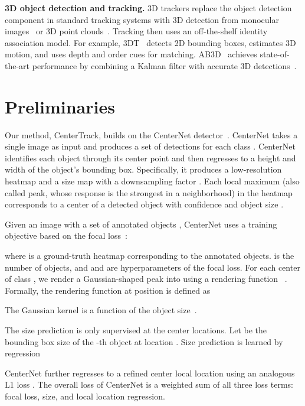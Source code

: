 \documentclass[runningheads]{llncs}
\renewcommand{\paragraph}[1]{\noindent\textbf{#1}}
\begin{document}
\paragraph{3D object detection and tracking.}
3D trackers replace the object detection component in standard tracking systems with 3D detection from monocular images~\cite{ren2017accurate} or 3D point clouds~\cite{zhu2019class,shi2019pointrcnn}.
Tracking then uses an off-the-shelf identity association model.
For example, 3DT~\cite{Hu3DT19} detects 2D bounding boxes, estimates 3D motion, and uses depth and order cues for matching.
AB3D~\cite{Weng2019_3dmot} achieves state-of-the-art performance by combining a Kalman filter with accurate 3D detections~\cite{shi2019pointrcnn}.

\section{Preliminaries}

Our method, CenterTrack, builds on the CenterNet detector~\cite{zhou2019objects}.
CenterNet takes a single image  as input and produces a set of detections  for each class .
CenterNet identifies each object through its center point  and then regresses to a height and width  of the object's bounding box.
Specifically, it produces a low-resolution heatmap  and a size map  with a downsampling factor . 
Each local maximum  (also called peak, whose response is the strongest in a  neighborhood) in the heatmap  corresponds to a center of a detected object with confidence  and object size .

Given an image with a set of annotated objects , CenterNet uses a training objective based on the focal loss~\cite{law2018cornernet,lin2017focal}:

where  is a ground-truth heatmap corresponding to the annotated objects.
 is the number of objects, and  and  are hyperparameters of the focal loss. 
For each center  of class , we render a Gaussian-shaped peak into  using a rendering function ~\cite{law2018cornernet}.
Formally, the rendering function at position  is defined as

The Gaussian kernel  is a function of the object size~\cite{law2018cornernet}.

The size prediction is only supervised at the center locations.
Let  be the bounding box size of the -th object at location .
Size prediction is learned by regression


CenterNet further regresses to a refined center local location using an analogous L1 loss .
The overall loss of CenterNet is a weighted sum of all three loss terms: focal loss, size, and local location regression.
\end{document}
